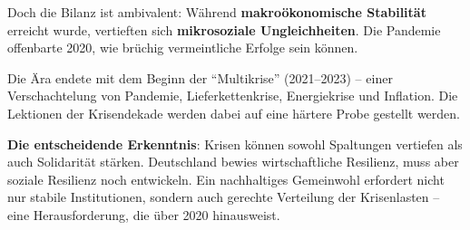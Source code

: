 Doch die Bilanz ist ambivalent: Während \textbf{makroökonomische Stabilität} erreicht wurde, vertieften sich \textbf{mikrosoziale Ungleichheiten}.
Die Pandemie offenbarte 2020, wie brüchig vermeintliche Erfolge sein können.

Die Ära endete mit dem Beginn der \enquote{Multikrise} (2021–2023) – einer Verschachtelung von Pandemie, Lieferkettenkrise, Energiekrise und Inflation. Die
Lektionen der Krisendekade werden dabei auf eine härtere Probe gestellt werden.

\textbf{Die entscheidende Erkenntnis}: Krisen können sowohl Spaltungen vertiefen als auch Solidarität stärken. Deutschland bewies wirtschaftliche
Resilienz, muss aber soziale Resilienz noch entwickeln. Ein nachhaltiges Gemeinwohl erfordert nicht nur stabile Institutionen, sondern auch gerechte
Verteilung der Krisenlasten – eine Herausforderung, die über 2020 hinausweist.

\endinput